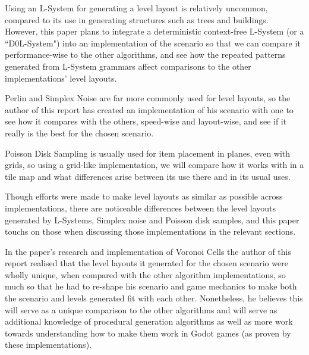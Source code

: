 Using an L-System for generating a level layout is relatively uncommon, compared to its use in generating structures such as trees and buildings. However, this paper plans to integrate a deterministic context-free L-System (or a ``D0L-System") into an implementation of the scenario so that we can compare it performance-wise to the other algorithms, and see how the repeated patterns generated from L-System grammars affect comparisons to the other implementations' level layouts. 

Perlin and Simplex Noise are far more commonly used for level layouts, so the author of this report has created an implementation of his scenario with one to see how it compares with the others, speed-wise and layout-wise, and see if it really is the best for the chosen scenario.

Poisson Disk Sampling is usually used for item placement in planes, even with grids, so using a grid-like implementation, we will compare how it works with in a tile map and what differences arise between its use there and in its usual uses.

Though efforts were made to make level layouts as similar as possible across implementations, there are noticeable differences between the level layouts generated by L-Systems, Simplex noise and Poisson disk samples, and this paper touchs on those when discussing those implementations in the relevant sections.

In the paper's research and implementation of Voronoi Cells the author of this report realised that the level layouts it generated for the chosen scenario were wholly unique, when compared with the other algorithm implementations, so much so that he had to re-shape his scenario and game mechanics to make both the scenario and levels generated fit with each other. Nonetheless, he believes this will serve as a unique comparison to the other algorithms and will serve as additional knowledge of procedural generation algorithms as well as more work towards understanding how to make them work in Godot games (as proven by these implementations).
